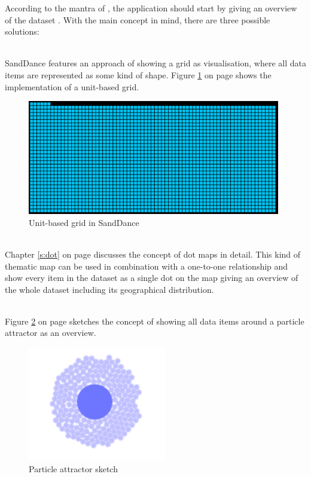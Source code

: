 According to the mantra of \citeauthor{Shneiderman1996}, the application should start by giving an overview of the dataset . With the main concept in mind, there are three possible solutions:
\begin{enumerate}

 \hfill \\
SandDance features an approach of showing a grid as visualisation, where all data items are represented as some kind of shape. Figure \ref{fig:sanddance-grid} on page \pageref{fig:sanddance-grid} shows the implementation of a unit-based grid.

\begin{figure}[!htb]
\centering
\includegraphics[height=5cm]{images/methods/related/sanddance-grid.png}
\caption[
    Unit-based grid in SandDance.
]{Unit-based grid in SandDance}
\label{fig:sanddance-grid}
\end{figure}
 \hfill \\
Chapter \ref{s:dot} on page \pageref{s:dot} discusses the concept of dot maps in detail. This kind of thematic map can be used in combination with a one-to-one relationship and show every item in the dataset as a single dot on the map giving an overview of the whole dataset including its geographical distribution.

 \hfill \\
Figure \ref{fig:particle-attractor} on page \pageref{fig:particle-attractor} sketches the concept of showing all data items around a particle attractor as an overview.

\begin{figure}[!htb]
\centering
\includegraphics[height=5cm]{images/methods/related/particle-attractor.png}
\caption[
    Particle attractor sketch.
]{Particle attractor sketch}
\label{fig:particle-attractor}
\end{figure}

\end{enumerate}

